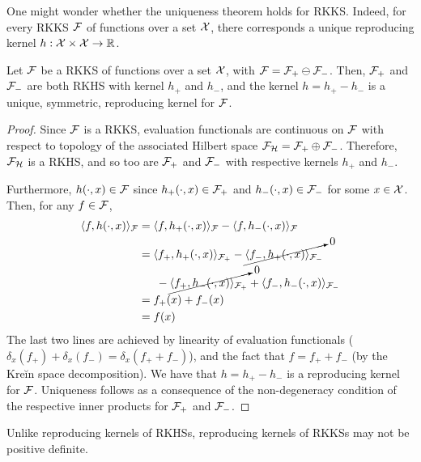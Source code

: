 One might wonder whether the uniqueness theorem  holds for RKKS.
Indeed, for every RKKS ${\mathcal F}$ of functions over a set ${\mathcal X}$, there corresponds a unique reproducing kernel $h:{\mathcal X}\times{\mathcal X}\to\mathbb{R}$.

\begin{lemma}
  Let ${\mathcal F}$ be a RKKS of functions over a set ${\mathcal X}$, with ${\mathcal F} = {\mathcal F}_+ \ominus {\mathcal F}_-$.
  Then, ${\mathcal F}_+$ and ${\mathcal F}_-$ are both RKHS with kernel $h_+$ and $h_-$, and the kernel $h = h_+ - h_-$ is a unique, symmetric, reproducing kernel for ${\mathcal F}$.  
\end{lemma}

\begin{proof}
  Since ${\mathcal F}$ is a RKKS, evaluation functionals are continuous on ${\mathcal F}$ with respect to topology of the associated Hilbert space ${\mathcal F}_{\mathcal H} = {\mathcal F}_+ \oplus {\mathcal F}_-$.
  Therefore, ${\mathcal F}_{\mathcal H}$ is a RKHS, and so too are ${\mathcal F}_+$ and ${\mathcal F}_-$ with respective kernels $h_+$ and $h_-$.
  
  Furthermore, $h(\cdot,x) \in{\mathcal F}$ since $h_+(\cdot,x) \in{\mathcal F}_+$ and $h_-(\cdot,x) \in{\mathcal F}_-$ for some $x\in{\mathcal X}$.
  Then, for any $f\in{\mathcal F}$,
  \begin{align*}
    \langle f, h(\cdot,x)\rangle_{\mathcal F} 
    &= \langle f, h_+(\cdot,x)\rangle_{{\mathcal F}} - \langle f, h_-(\cdot,x)\rangle_{{\mathcal F}} \\ 
    &= \langle f_+, h_+(\cdot,x)\rangle_{{\mathcal F}_+} - \cancelto{0}{\langle f_-, h_+(\cdot,x)\rangle_{{\mathcal F}_-}} \\
    &\phantom{==} - \cancelto{0}{\langle f_+, h_-(\cdot,x)\rangle_{{\mathcal F}_+}} + \langle f_-, h_-(\cdot,x)\rangle_{{\mathcal F}_-} \\
    &= f_+(x) + f_-(x) \\
    &= f(x)
  \end{align*}
  The last two lines are achieved by linearity of evaluation functionals ($\delta_x(f_+) + \delta_x(f_-) = \delta_x(f_+ + f_-)$), and the fact that $f = f_+ + f_-$ (by the Kreĭn space decomposition).
  We have that $h=h_+ - h_-$ is a reproducing kernel for ${\mathcal F}$.
  Uniqueness follows as a consequence of the non-degeneracy condition of the respective inner products for ${\mathcal F}_+$ and ${\mathcal F}_-$.
\end{proof}

\begin{remark}
  Unlike reproducing kernels of RKHSs, reproducing kernels of RKKSs may not be positive definite.
\end{remark}

